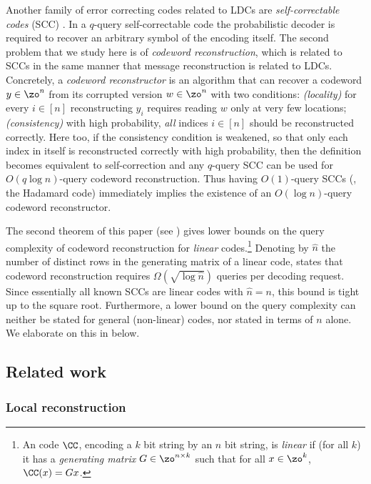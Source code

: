 Another family of error correcting codes related to LDCs are 
%
\emph{self-correctable codes} 
(SCC) \cite{blr}. In a $q$-query self-correctable
code the probabilistic decoder is required to recover an arbitrary symbol of the
encoding itself.
The second problem that we study here is of \emph{codeword reconstruction}, which is related to SCCs in the same manner that message reconstruction is related to LDCs.
Concretely, a \emph{codeword reconstructor} is an algorithm that can recover a codeword $y\in \zo^n$ from its corrupted version $w \in \zo^n$ with two conditions:
\emph{(locality)} for every $i \in [n]$ reconstructing $y_i$ requires reading $w$ only at very few locations;
\emph{(consistency)} with high probability, \emph{all} indices $i \in [n]$ should be reconstructed correctly.
Here too, if the consistency condition is weakened, so that only each index in itself
is reconstructed correctly with high probability, then the
definition becomes equivalent to 
%
self-correction
and any $q$-query SCC can be used for $O(q \log n)$-query codeword reconstruction. Thus having $O(1)$-query SCCs (\eg, the Hadamard code) immediately implies the existence of an $O(\log n)$-query codeword reconstructor.

The second theorem of this paper (see ) gives lower bounds on the query complexity of codeword reconstruction for \emph{linear} codes.\footnote{An code $\CC$, encoding a $k$ bit string by an $n$ bit string,  is \emph{linear} if (for all $k$) it has a \emph{generating matrix} $G \in \zo^{n \times k}$ such that for all $x \in \zo^k$, $\CC(x) = Gx$.} Denoting by $\hat{n}$ the number of distinct rows in the generating matrix of a linear code,  states that codeword reconstruction requires $\Omega(\sqrt{ \log \hat{n}})$ queries per decoding request.
Since essentially all known SCCs are linear codes with $\hat{n}=n$, this bound is tight up to the square root. Furthermore, a lower bound on the query complexity can neither be stated for general (non-linear) codes, nor stated in terms of $n$ alone. We elaborate on this in  below.

\subsection{Related work}

\subsubsection{Local reconstruction}

